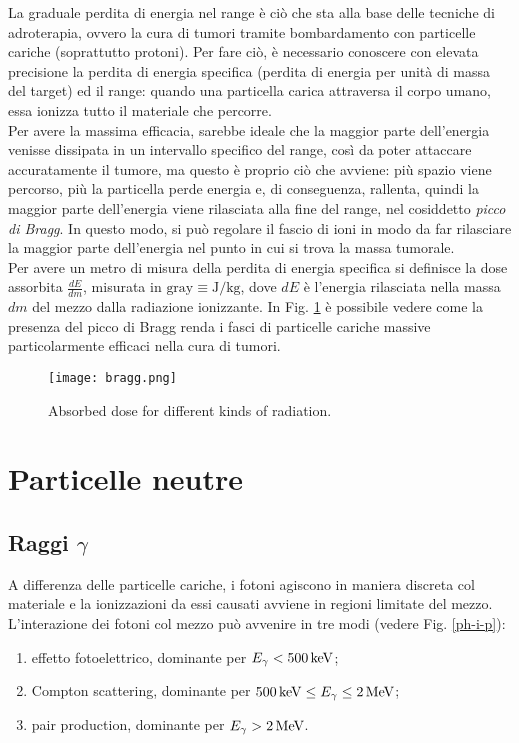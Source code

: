 La graduale perdita di energia nel range è ciò che sta alla base delle tecniche di adroterapia, ovvero la cura di tumori tramite bombardamento con particelle cariche (soprattutto protoni). Per fare ciò, è necessario conoscere con elevata precisione la perdita di energia specifica (perdita di energia per unità di massa del target) ed il range: quando una particella carica attraversa il corpo umano, essa ionizza tutto il materiale che percorre.\\
Per avere la massima efficacia, sarebbe ideale che la maggior parte dell'energia venisse dissipata in un intervallo specifico del range, così da poter attaccare accuratamente il tumore, ma questo è proprio ciò che avviene: più spazio viene percorso, più la particella perde energia e, di conseguenza, rallenta, quindi la maggior parte dell'energia viene rilasciata alla fine del range, nel cosiddetto \textit{picco di Bragg}. In questo modo, si può regolare il fascio di ioni in modo da far rilasciare la maggior parte dell'energia nel punto in cui si trova la massa tumorale.\\
Per avere un metro di misura della perdita di energia specifica si definisce la dose assorbita $ \frac{dE}{dm} $, misurata in $ \text{gray} \equiv \text{J} / \text{kg} $, dove $ dE $ è l'energia rilasciata nella massa $ dm $ del mezzo dalla radiazione ionizzante. In Fig. \ref{bragg} è possibile vedere come la presenza del picco di Bragg renda i fasci di particelle cariche massive particolarmente efficaci nella cura di tumori.

\begin{figure}[!t]
	\centering
	\texttt{[image: bragg.png]}
	\caption{Absorbed dose for different kinds of radiation.}
	\label{bragg}
\end{figure}

\section{Particelle neutre}

\subsection{Raggi \texorpdfstring{$ \gamma $}{TEXT}}

A differenza delle particelle cariche, i fotoni agiscono in maniera discreta col materiale e la ionizzazioni da essi causati avviene in regioni limitate del mezzo.\\
L'interazione dei fotoni col mezzo può avvenire in tre modi (vedere Fig. \ref{ph-i-p}):
\begin{enumerate}
	\item effetto fotoelettrico, dominante per $ E_{\gamma} < 500 \,\mathrm{keV} $;
	\item Compton scattering, dominante per $ 500 \,\mathrm{keV} \le E_{\gamma} \le 2 \,\mathrm{MeV} $;
	\item pair production, dominante per $ E_{\gamma} > 2 \,\mathrm{MeV} $.
\end{enumerate}


